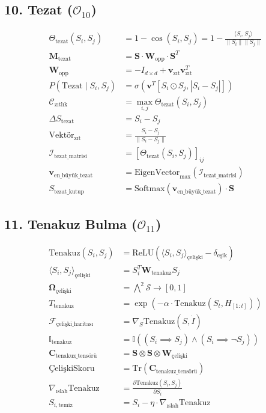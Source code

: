 \documentclass[11pt, a4paper]{article}
\begin{document}
\subsection{10. Tezat ($\mathcal{O}_{10}$)}
\begin{align}
\Theta_{\text{tezat}}(S_i, S_j) &= 1 - \cos(S_i, S_j) = 1 - \frac{\langle S_i, S_j \rangle}{\|S_i\| \|S_j\|} \\
\mathbf{M}_{\text{tezat}} &= \mathbf{S} \cdot \mathbf{W}_{\text{opp}} \cdot \mathbf{S}^T \\
\mathbf{W}_{\text{opp}} &= -I_{d \times d} + \mathbf{v}_{\text{zıt}} \mathbf{v}_{\text{zıt}}^T \\
P(\text{Tezat} \mid S_i, S_j) &= \sigma\left( \mathbf{v}^T [S_i \odot S_j, |S_i - S_j|] \right) \\
\mathcal{C}_{\text{zıtlık}} &= \max_{i,j} \Theta_{\text{tezat}}(S_i, S_j) \\
\Delta S_{\text{tezat}} &= S_i - S_j \\
\text{Vektör}_{\text{zıt}} &= \frac{S_i - S_j}{\|S_i - S_j\|} \\
\mathcal{I}_{\text{tezat\_matrisi}} &= \left[ \Theta_{\text{tezat}}(S_i, S_j) \right]_{ij} \\
\mathbf{v}_{\text{en\_büyük\_tezat}} &= \text{EigenVector}_{\max}(\mathcal{I}_{\text{tezat\_matrisi}}) \\
S_{\text{tezat\_kutup}} &= \text{Softmax}(\mathbf{v}_{\text{en\_büyük\_tezat}}) \cdot \mathbf{S}
\end{align}

\subsection{11. Tenakuz Bulma ($\mathcal{O}_{11}$)}
\begin{align}
\text{Tenakuz}(S_i, S_j) &= \text{ReLU}\left( \langle S_i, S_j \rangle_{\text{çelişki}} - \delta_{\text{eşik}} \right) \\
\langle S_i, S_j \rangle_{\text{çelişki}} &= S_i^T \mathbf{W}_{\text{tenakuz}} S_j \\
\mathbf{\Omega}_{\text{çelişki}} &= \bigwedge^2 \mathcal{S} \to [0, 1] \\
T_{\text{tenakuz}} &= \exp\left( -\alpha \cdot \text{Tenakuz}(S_t, H_{[1:t]}) \right) \\
\mathcal{F}_{\text{çelişki\_haritası}} &= \nabla_S \text{Tenakuz}(S, \dot{I}) \\
\mathbb{I}_{\text{tenakuz}} &= \mathbb{I}\left( (S_i \implies S_j) \land (S_i \implies \neg S_j) \right) \\
\mathbf{C}_{\text{tenakuz\_tensörü}} &= \mathbf{S} \otimes \mathbf{S} \otimes \mathbf{W}_{\text{çelişki}} \\
\text{ÇelişkiSkoru} &= \text{Tr}(\mathbf{C}_{\text{tenakuz\_tensörü}}) \\
\nabla_{\text{ıslah}} \text{Tenakuz} &= \frac{\partial \text{Tenakuz}(S_i, S_j)}{\partial S_i} \\
S_{i, \text{temiz}} &= S_i - \eta \cdot \nabla_{\text{ıslah}} \text{Tenakuz}
\end{align}
\end{document}
